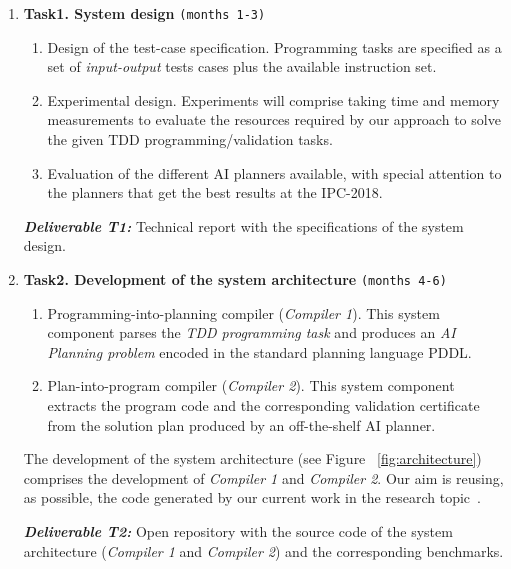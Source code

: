 \documentclass[10pt,a4paper]{paper}
\begin{document}
\begin{enumerate}
\item {\bf Task1. System design} {\tt\small (months 1-3)}
  \begin{small}
    \begin{enumerate}
    \item Design of the test-case specification. Programming tasks are specified as a set of {\em input-output} tests cases plus the available instruction set. 
    \item Experimental design. Experiments will comprise taking time and memory measurements to evaluate the resources required by our approach to solve the given TDD programming/validation tasks.
    \item Evaluation of the different AI planners available, with special attention to the planners that get the best results at the IPC-2018. 
      \end{enumerate}
  \end{small}

{\small{\bf\em  Deliverable T1:} Technical report with the specifications of the system design.}
  
\item {\bf Task2. Development of the system architecture} {\tt\small (months 4-6)}
    \begin{small}
      \begin{enumerate}
      \item Programming-into-planning compiler ({\em Compiler 1}). This system component parses the {\em TDD programming task} and produces an {\em AI Planning problem} encoded in the standard planning language PDDL.
      \item Plan-into-program compiler ({\em Compiler 2}). This system component extracts the program code and the corresponding validation certificate from the solution plan produced by an off-the-shelf AI planner.
      \end{enumerate}
\end{small}      
The development of the system architecture (see Figure ~\ref{fig:architecture}) comprises the development of {\em Compiler 1} and {\em Compiler 2}. Our aim is reusing, as possible, the code generated by our current work in the research topic~\cite{jimenez2015computing,sergio:aprograming:icaps16,sergio:aprogramingb:ijcai16,sergio:aprograming:ijcai16,segovia2017generating,segovia:FSC:JAIR2018,segovia:programs:AIJ19}.
 
{\small{\bf\em Deliverable T2:} Open repository with the source code of the system architecture ({\em Compiler 1} and {\em Compiler 2}) and the corresponding benchmarks.}


\end{enumerate}
\end{document}

